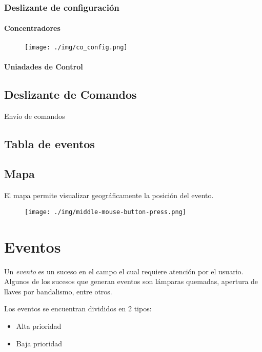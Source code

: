 \documentclass[11pt,a4paper]{report}
\begin{document}
\subsection{Deslizante de configuración}
\subsubsection{Concentradores}
\begin{center}
	\begin{figure}[h] %
	\texttt{[image: ./img/co\_config.png]}
	\end{figure}
\end{center}


\subsubsection{Uniadades de Control}
\section{Deslizante de Comandos}
Envío de comandos

\section{Tabla de eventos}

\newpage
\section{Mapa}
\label{ch:mapa}
El mapa permite visualizar geográficamente la posición del evento.

\begin{center}
	\begin{figure}[h] %
	\texttt{[image: ./img/middle-mouse-button-press.png]}
	\end{figure}
\end{center}



\chapter{Eventos}
\label{ch:eventos}
Un \emph{evento} es un suceso en el campo el cual requiere atención por el
usuario. Algunos de los sucesos que generan eventos son lámparas quemadas,
apertura de llaves por bandalismo, entre otros.

Los eventos se encuentran divididos en 2 tipos:
\begin{itemize}
  \item Alta prioridad
  \item Baja prioridad
  
\end{itemize}
\end{document}
